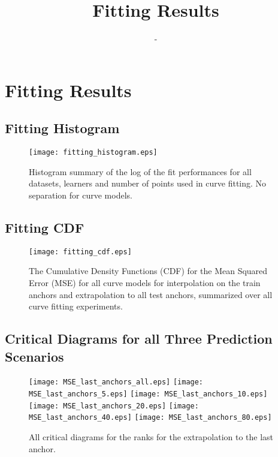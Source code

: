 \documentclass{article}
\title{Fitting Results}
\author{-}
\begin{document}
\maketitle

\section{Fitting Results}

\subsection{Fitting Histogram}

\begin{figure}[tbh]
    \centering
    \texttt{[image: fitting\_histogram.eps]}
    \caption{Histogram summary of the log of the fit performances for all datasets, learners and number of points used in curve fitting.
    No separation for curve models.
    }
    \label{fig:mse_distribution:pdf}
\end{figure}

\FloatBarrier

\subsection{Fitting CDF}

\begin{figure}[tbh]
    \centering
    \texttt{[image: fitting\_cdf.eps]}
    \caption{The Cumulative Density Functions (CDF) for the Mean Squared Error (MSE) for all curve models for interpolation on the train anchors and extrapolation to all test anchors, summarized over all curve fitting experiments.}
    \label{fig:cdfs_curve_fitting}
\end{figure}

\FloatBarrier

\subsection{Critical Diagrams for all Three Prediction Scenarios}

\begin{figure}[h]
    \centering
    \texttt{[image: MSE\_last\_anchors\_all.eps]}
    \texttt{[image: MSE\_last\_anchors\_5.eps]}
    \texttt{[image: MSE\_last\_anchors\_10.eps]}
    \texttt{[image: MSE\_last\_anchors\_20.eps]}
    \texttt{[image: MSE\_last\_anchors\_40.eps]}
    \texttt{[image: MSE\_last\_anchors\_80.eps]}
    \caption{All critical diagrams for the ranks for the extrapolation to the last anchor. }
\end{figure}
\end{document}
